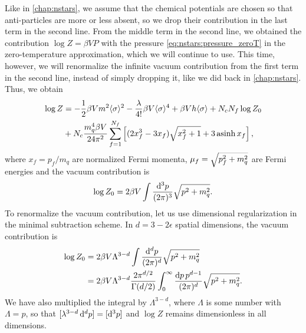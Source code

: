 Like in \cref{chap:nstars}, we assume that the chemical potentials are chosen so that anti-particles are more or less absent, so we drop their contribution in the last term in the second line.
From the middle term in the second line, we obtained the contribution $\log Z = \beta V P$ with the pressure \eqref{eq:nstars:pressure_zeroT} in the zero-temperature approximation, which we will continue to use.
This time, however, we will renormalize the infinite vacuum contribution from the first term in the second line, instead of simply dropping it, like we did back in \cref{chap:nstars}.
Thus, we obtain
\begin{equation}
\begin{split}
	\log Z &= -\frac12 \beta V m^2 \langle \sigma \rangle^2 - \frac{\lambda}{4!} \beta V \langle \sigma \rangle^4 + \beta V h \langle \sigma \rangle + N_c N_f \log Z_0 \\
	       &+ N_c \frac{m_q^4 \beta V}{24 \pi^2} \sum_{f=1}^{N_f} \left[ (2 x_f^3 - 3x_f) \sqrt{x_f^2 + 1} + 3 \operatorname{asinh} x_f \right],
\end{split}
\end{equation}
where $x_f = p_f / m_q$ are normalized Fermi momenta, $\mu_f = \smash{\sqrt{p_f^2 + m_q^2}}$ are Fermi energies and the vacuum contribution is
\begin{equation}
	\log Z_0 = 2 \beta V \int \frac{\mathop{}\!\mathrm{d}^3 p}{(2 \pi)^3} \sqrt{p^2 + m_q^2 } .
\label{eq:lsm:vacuum_contribution_3dim}
\end{equation}
To renormalize the vacuum contribution, let us use dimensional regularization in the minimal subtraction scheme.
In $d = 3 - 2 \epsilon$ spatial dimensions, the vacuum contribution is
\begin{equation}
\begin{split}
	\log Z_0 &= 2 \beta V \Lambda^{3-d} \int \frac{\mathop{}\!\mathrm{d}^d p}{(2 \pi)^d} \sqrt{p^2 + m_q^2} \\
	         &= 2 \beta V \Lambda^{3-d} \frac{2 \pi^{d/2}}{\Gamma(d/2)} \int_0^\infty \frac{\mathop{}\!\mathrm{d} p \, p^{d-1}}{(2 \pi)^d} \sqrt{p^2 + m_q^2} .
\end{split}
\label{eq:lsm:vacuum_contribution_ddim}
\end{equation}
We have also multiplied the integral by $\Lambda^{3-d}$,
where $\Lambda$ is some number with $\unit{\Lambda} = \unit{p}$,
so that $[\lambda^{3-d} \mathop{}\!\mathrm{d}^d p] = [\mathop{}\!\mathrm{d}^3 p]$ and $\log Z$ remains dimensionless in all dimensions.
